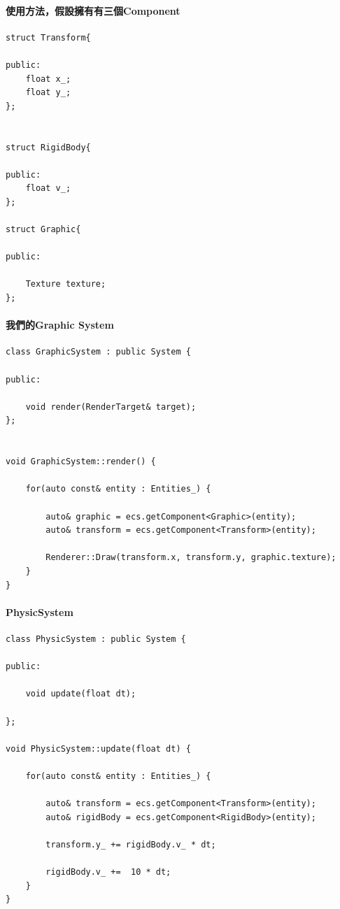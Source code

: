 \paragraph{使用方法，假設擁有有三個Component}

\begin{lstlisting}
struct Transform{

public:
    float x_;
    float y_;
};


struct RigidBody{

public:
    float v_;
};

struct Graphic{

public:

    Texture texture;
};
\end{lstlisting}

\paragraph{我們的Graphic System}

\begin{lstlisting}
class GraphicSystem : public System {

public:

    void render(RenderTarget& target);
};


void GraphicSystem::render() {

    for(auto const& entity : Entities_) {

        auto& graphic = ecs.getComponent<Graphic>(entity);
        auto& transform = ecs.getComponent<Transform>(entity);
        
        Renderer::Draw(transform.x, transform.y, graphic.texture);
    }
}
\end{lstlisting}

\paragraph{PhysicSystem}

\begin{lstlisting}
class PhysicSystem : public System {

public:

    void update(float dt);

};

void PhysicSystem::update(float dt) {

    for(auto const& entity : Entities_) {

        auto& transform = ecs.getComponent<Transform>(entity);
        auto& rigidBody = ecs.getComponent<RigidBody>(entity);

        transform.y_ += rigidBody.v_ * dt;

        rigidBody.v_ +=  10 * dt;
    }
}
\end{lstlisting}


